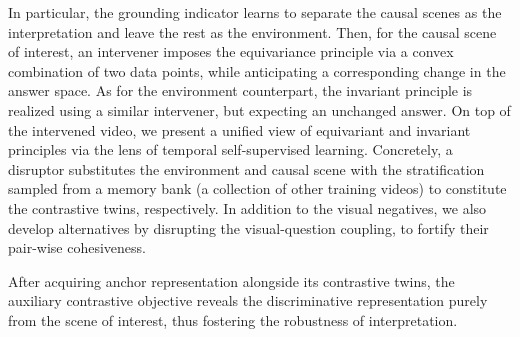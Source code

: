 %
In particular, the grounding indicator learns to separate the causal scenes as the interpretation and leave the rest as the environment. 
%
Then, for the causal scene of interest, an intervener imposes the equivariance principle via a convex combination of two data points, while anticipating a corresponding change in the answer space.  
%
As for the environment counterpart, the invariant principle is realized using a similar intervener, but expecting an unchanged answer.
%
%
On top of the intervened video, we present a unified view of equivariant and invariant principles via the lens of temporal self-supervised learning. 
%
Concretely, a disruptor substitutes the environment and causal scene with the stratification sampled from a memory bank (a collection of other training videos) to constitute the contrastive twins, respectively. 
%
%
In addition to the visual negatives, we also develop alternatives by disrupting the visual-question coupling, to fortify their pair-wise cohesiveness.


% 
After acquiring anchor representation alongside its contrastive twins, the auxiliary contrastive objective reveals the discriminative representation purely from the scene of interest, thus fostering the robustness of interpretation.

